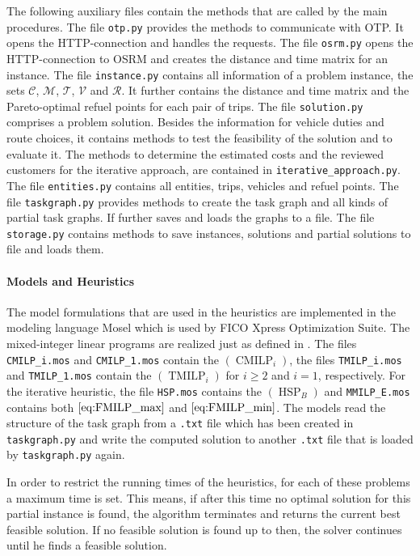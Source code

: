 The following auxiliary files contain the methods that are called by the main procedures. The file \texttt{otp.py} provides the methods to communicate with OTP. It opens the HTTP-connection and handles the requests. The file \texttt{osrm.py} opens the HTTP-connection to OSRM and creates the distance and time matrix for an instance. The file \texttt{instance.py} contains all information of a problem instance, \ie the sets $\mathcal{C}$, $\mathcal{M}$, $\mathcal{T}$, $\mathcal{V}$ and $\mathcal{R}$. It further contains the distance and time matrix and the Pareto-optimal refuel points for each pair of trips. The file \texttt	{solution.py} comprises a problem solution. Besides the information for vehicle duties and route choices, it contains methods to test the feasibility of the solution and to evaluate it. The methods to determine the estimated costs and the reviewed customers for the iterative approach, are contained in \texttt{iterative\_approach.py}. The file \texttt{entities.py} contains all entities, \ie trips, vehicles and refuel points. The file \texttt{taskgraph.py} provides methods to create the task graph and all kinds of partial task graphs. If further saves and loads the graphs to a file. The file \texttt{storage.py} contains methods to save instances, solutions and partial solutions to file and loads them.

\paragraph{Models and Heuristics} \parfill

The model formulations that are used in the heuristics are implemented in the modeling language Mosel which is used by FICO Xpress Optimization Suite. The mixed-integer linear programs are realized just as defined in . The files \texttt{CMILP\_i.mos} and \texttt{CMILP\_1.mos} contain the $(\operatorname{CMILP}_i)$, the files \texttt{TMILP\_i.mos} and \texttt{TMILP\_1.mos} contain the $(\operatorname{TMILP}_i)$ for $i\geq 2$ and $i = 1$, respectively. For the iterative heuristic, the file \texttt{HSP.mos} contains the $(\operatorname{HSP}_B)$ and \texttt{MMILP\_E.mos} contains both $\eqref{eq:FMILP_max}$ and $\eqref{eq:FMILP_min}$. The models read the structure of the task graph from a \texttt{.txt} file which has been created in \texttt{taskgraph.py} and write the computed solution to another \texttt{.txt} file that is loaded by \texttt{taskgraph.py} again.

In order to restrict the running times of the heuristics, for each of these problems a maximum time is set. This means, if after this time no optimal solution for this partial instance is found, the algorithm terminates and returns the current best feasible solution. If no feasible solution is found up to then, the solver continues until he finds a feasible solution.

